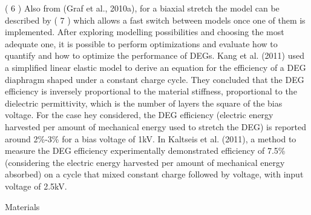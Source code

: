 ( 6 )
Also from (Graf et al., 2010a), for a biaxial stretch the model can be described by 
( 7 )
which allows a fast switch between models once one of them is implemented.
After exploring modelling possibilities and choosing the most adequate one, it is possible to perform optimizations and evaluate how to quantify and how to optimize the performance of DEGs.  Kang et al. (2011) used a simplified linear elastic model to derive an equation for the efficiency of a DEG diaphragm shaped under a constant charge cycle. They concluded that the DEG efficiency is inversely proportional to the material stiffness, proportional to the dielectric permittivity, which is the number of layers the square of the bias voltage. For the case hey considered, the DEG efficiency (electric energy harvested per amount of mechanical energy used to stretch the DEG) is reported around 2\%-3\% for a bias voltage of 1kV. In Kaltseis et al. (2011), a method to measure the DEG efficiency experimentally demonstrated efficiency of 7.5\% (considering the electric energy harvested per amount of mechanical energy absorbed) on a cycle that mixed constant charge followed by voltage, with input voltage of 2.5kV.

Materials

